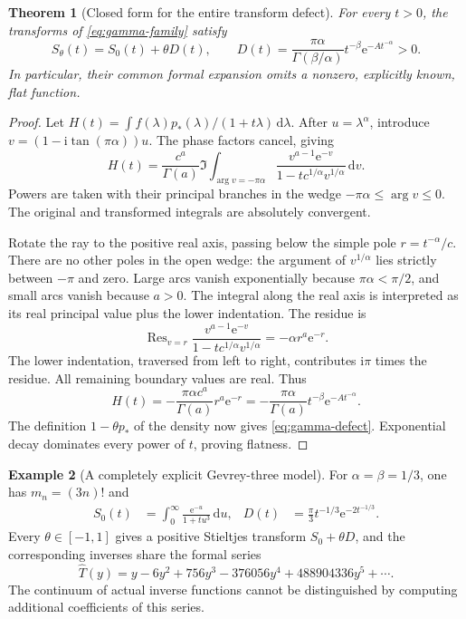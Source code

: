 \documentclass[11pt,a4paper]{article}
\numberwithin{equation}{section}
\newtheorem{theorem}{Theorem}[section]
\theoremstyle{definition}
\newtheorem{example}[theorem]{Example}
\theoremstyle{remark}
\newcommand{\dd}{\,\mathrm d}
\newcommand{\ii}{\mathrm i}
\newcommand{\ee}{\mathrm e}
\newcommand{\Res}{\operatorname{Res}}
\begin{document}
\begin{theorem}[Closed form for the entire transform defect]
\label{thm:gamma-defect}
For every \(t>0\), the transforms of \eqref{eq:gamma-family} satisfy
\begin{equation}
 S_\theta(t)=S_0(t)+\theta D(t),\qquad
 D(t)=\frac{\pi\alpha}{\Gamma(\beta/\alpha)}
       t^{-\beta}\ee^{-At^{-\alpha}}>0.
 \label{eq:gamma-defect}
\end{equation}
In particular, their common formal expansion omits a nonzero, explicitly
known, flat function.
\end{theorem}
\begin{proof}
Let \(H(t)=\int f(\lambda)p_*(\lambda)/(1+t\lambda)\dd\lambda\).
After \(u=\lambda^\alpha\), introduce
\(v=(1-\ii\tan(\pi\alpha))u\). The phase factors cancel, giving
\begin{equation}
 H(t)=\frac{c^a}{\Gamma(a)}\Im
 \int_{\arg v=-\pi\alpha}
 \frac{v^{a-1}\ee^{-v}}{1-tc^{1/\alpha}v^{1/\alpha}}\dd v.
 \label{eq:gamma-contour}
\end{equation}
Powers are taken with their principal branches in the wedge
\(-\pi\alpha\le\arg v\le0\). The original and transformed integrals
are absolutely convergent.

Rotate the ray to the positive real axis, passing below the simple pole
\(r=t^{-\alpha}/c\). There are no other poles in the open wedge:
the argument of \(v^{1/\alpha}\) lies strictly between \(-\pi\) and
zero. Large arcs vanish exponentially because \(\pi\alpha<\pi/2\),
and small arcs vanish because \(a>0\). The integral along the real axis
is interpreted as its real principal value plus the lower indentation.
The residue is
\begin{equation}
 \Res_{v=r}\frac{v^{a-1}\ee^{-v}}
                        {1-tc^{1/\alpha}v^{1/\alpha}}
 =-\alpha r^a\ee^{-r}.
\end{equation}
The lower indentation, traversed from left to right, contributes
\(\ii\pi\) times the residue. All remaining boundary values are real.
Thus
\[
 H(t)=-\frac{\pi\alpha c^a}{\Gamma(a)}r^a\ee^{-r}
     =-\frac{\pi\alpha}{\Gamma(a)}t^{-\beta}\ee^{-At^{-\alpha}}.
\]
The definition \(1-\theta p_*\) of the density now gives
\eqref{eq:gamma-defect}. Exponential decay dominates every power of
\(t\), proving flatness.
\end{proof}

\begin{example}[A completely explicit Gevrey-three model]
\label{ex:cubic}
For \(\alpha=\beta=1/3\), one has \(m_n=(3n)!\) and
\begin{align}
 S_0(t)&=\int_0^\infty\frac{\ee^{-u}}{1+tu^3}\dd u,
 &D(t)&=\frac\pi3t^{-1/3}\ee^{-2t^{-1/3}}.\label{eq:cubic}
\end{align}
Every \(\theta\in[-1,1]\) gives a positive Stieltjes transform
\(S_0+\theta D\), and the corresponding inverses share the formal series
\begin{equation}
 \widehat T(y)=y-6y^2+756y^3-376056y^4
                  +488904336y^5+\cdots.
 \label{eq:cubic-inverse}
\end{equation}
The continuum of actual inverse functions cannot be distinguished by
computing additional coefficients of this series.
\end{example}
\end{document}

